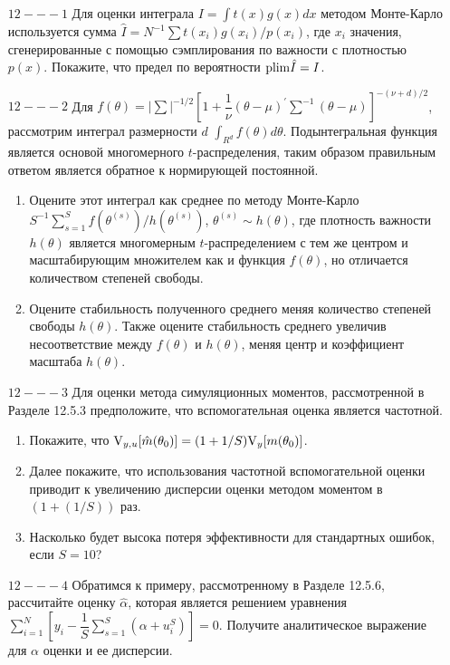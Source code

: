 \begin{enumerate}
\item [$12 --- 1$] Для оценки интеграла $I=\int{t(x)g(x)dx}$ методом Монте-Карло используется сумма $\hat{I}=N^{-1}\sum{t(x_i)g(x_i)/p(x_i)}$, где $x_i$ значения, сгенерированные с помощью сэмплирования по важности с плотностью $p(x)$. Покажите, что предел по вероятности $\mathrm{plim } \hat{I}=I$.

\item [$12 --- 2$]  Для $f(\theta)=|\sum|^{-1/2}[1+\dfrac{1}{\nu}(\theta-\mu)^{'}\sum^{-1}(\theta-\mu)]^{-(\nu+d)/2}$, рассмотрим интеграл размерности $d$ $\int_{R^{d}}f(\theta)d\theta$. Подынтегральная функция является основой многомерного $t$-распределения, таким образом правильным ответом является обратное к нормирующей постоянной. 
\begin{enumerate}
\item Оцените этот интеграл как среднее по методу Монте-Карло $S^{-1}\sum^{S}_{s=1}f(\theta^{(s)})/h(\theta^{(s)})$, $\theta^{(s)}\sim h(\theta)$, где плотность важности $h(\theta)$ является многомерным $t$-распределением с тем же центром и масштабирующим множителем как и функция $f(\theta)$, но отличается количеством степеней свободы.
\item Оцените стабильность полученного среднего меняя количество степеней свободы $h(\theta)$. Также оцените стабильность среднего увеличив несоответствие между $f(\theta)$ и $h(\theta)$, меняя центр и коэффициент масштаба $h(\theta)$.
\end{enumerate}

\item [$12 --- 3$] Для оценки метода симуляционных моментов, рассмотренной в Разделе 12.5.3 предположите, что вспомогательная оценка является частотной.
\begin{enumerate}
\item Покажите, что $\mathrm{V}_{y,u}[\hat{m}(\theta_0)]=(1+1/S)\mathrm{V}_{y}[m(\theta_0)]$.
\item Далее покажите, что  использования частотной вспомогательной оценки приводит к увеличению дисперсии оценки методом моментом в $(1+(1/S))$ раз.
\item Насколько будет высока потеря эффективности для стандартных ошибок, если $S=10$?
\end{enumerate}

\item [$12 --- 4$]  Обратимся к примеру, рассмотренному в Разделе 12.5.6, рассчитайте оценку $\hat{\alpha}$, которая является решением уравнения $\sum^{N}_{i=1}[y_i-\dfrac{1}{S}\sum^{S}_{s=1}(\alpha+u^{S}_i)]=0$. Получите аналитическое выражение для $\alpha$ оценки и ее дисперсии.


\end{enumerate}

